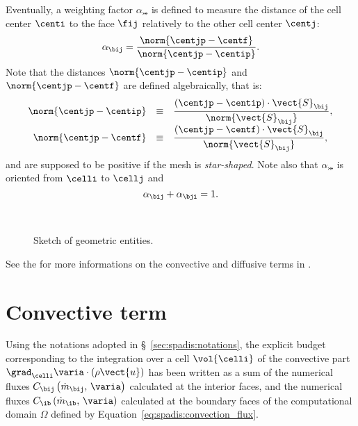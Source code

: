 Eventually, a weighting factor $\alpha_{\bij}$ is defined to measure the distance of the cell center $\centi$ to the face $\fij$ relatively
to the other cell center $\centj$:
\begin{equation}\label{eq:spadis:pond_def}
\alpha_{\bij}=\dfrac{\norm{\centjp - \centf}}{\norm{\centjp - \centip}}.
\end{equation}
Note that the distances  $\norm{\centjp - \centip}$ and $\norm{\centjp - \centf}$ are defined algebraically, that is:
\begin{equation}
\begin{array}{r c l}
\norm{\centjp - \centip} & \equiv & \dfrac{\left(\centjp - \centip\right) \cdot \vect{S}_{\bij}}{\norm{\vect{S}_{\bij}}}, \\
\norm{\centjp - \centf} & \equiv & \dfrac{\left(\centjp - \centf\right) \cdot \vect{S}_{\bij}}{\norm{\vect{S}_{\bij}}},
\end{array}
\end{equation}
and are supposed to be positive if the mesh is \emph{star-shaped}. Note also that $\alpha_{\bij}$ is oriented from $\celli$ to $\cellj$ and
%
\begin{equation}
\alpha_{\bij} + \alpha_{\bji} = 1.
\end{equation}

\begin{figure}[t]
\centering
\mbox{
 \,
}%
\caption{Sketch of geometric entities.}
\label{fig:sketch_internal_external_faces}
\end{figure}

See the 
for more informations on the convective and diffusive terms in \CS.

\hypertarget{conv-diff}{}

\section{Convective term}\label{sec:spadis:convection}
Using the notations adopted in \S~\ref{sec:spadis:notations},
the explicit budget corresponding to the integration over a cell
$\vol{\celli}$ of the convective part $\grad_{\celli} \varia \cdot \left(\rho \vect{u} \right) $
has been written as a sum of the
numerical fluxes $C_{\bij} \left( \dot{m}_{\bij} , \, \varia \right)$ calculated at the interior faces,
 and the numerical fluxes $C_\ib \left( \dot{m}_\ib , \, \varia \right)$ calculated at the
boundary faces of the computational domain $\Omega$ defined by Equation~\eqref{eq:spadis:convection_flux}.

